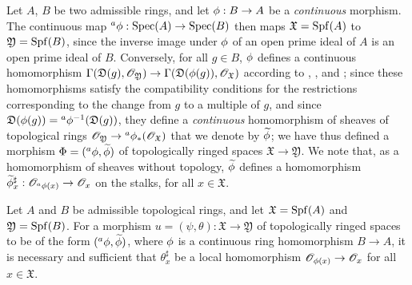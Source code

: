 \begin{env}[10.2.1]
\label{1.10.2.1}
Let $A$, $B$ be two admissible rings, and let $\vphi:B\to A$ be a \emph{continuous} morphism.
The continuous map ${}^a\vphi:\Spec(A)\to\Spec(B)$  then maps $\mathfrak{X}=\operatorname{Spf}(A)$ to $\mathfrak{Y}=\operatorname{Spf}(B)$, since the inverse image under $\phi$ of an open prime ideal of $A$ is an open prime ideal of $B$.
Conversely, for all $g\in B$, $\phi$ defines a continuous homomorphism $\Gamma(\mathfrak{D}(g),\sh{O}_\mathfrak{Y})\to\Gamma(\mathfrak{D}(\vphi(g)),\sh{O}_\mathfrak{X})$ according to , , and ;
since these homomorphisms satisfy the compatibility conditions for the restrictions corresponding to the change from $g$ to a multiple of $g$, and since $\mathfrak{D}(\phi(g))={}^a\phi^{-1}(\mathfrak{D}(g))$, they define a \emph{continuous} homomorphism of sheaves of topological rings $\sh{O}_\mathfrak{Y}\to{}^a\vphi_*(\sh{O}_\mathfrak{X})$  that we denote by $\widetilde{\phi}$;
we have thus defined a morphism $\Phi=({}^a\phi,\widetilde{\phi})$ of topologically ringed spaces $\mathfrak{X}\to\mathfrak{Y}$.
We note that, as a homomorphism of sheaves without topology, $\widetilde{\phi}$ defines a homomorphism $\widetilde{\vphi}_x^\sharp:\sh{O}_{{}^a\vphi(x)}\to\sh{O}_x$ on the stalks, for all $x\in\mathfrak{X}$.
\end{env}

\begin{proposition}[10.2.2]
\label{1.10.2.2}
Let $A$ and $B$ be admissible topological rings, and let $\mathfrak{X}=\operatorname{Spf}(A)$ and $\mathfrak{Y}=\operatorname{Spf}(B)$.
For a morphism $u=(\psi,\theta):\mathfrak{X}\to\mathfrak{Y}$ of topologically ringed spaces to be of the form $({}^a\phi,\widetilde{\phi})$, where $\phi$ is a continuous ring homomorphism $B\to A$, it is necessary and sufficient that $\theta_x^\sharp$ be a local homomorphism $\sh{O}_{\vphi(x)}\to\sh{O}_x$ for all $x\in\mathfrak{X}$.
\end{proposition}

